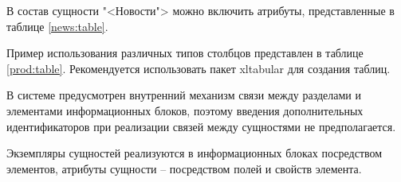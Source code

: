В состав сущности "<Новости"> можно включить атрибуты, представленные в таблице \ref{news:table}.



Пример использования различных типов столбцов представлен в таблице \ref{prod:table}. Рекомендуется использовать пакет xltabular для создания таблиц.

В системе предусмотрен внутренний механизм связи между разделами и элементами информационных блоков, поэтому введения дополнительных идентификаторов при реализации связей между сущностями не предполагается.

Экземпляры сущностей реализуются в информационных блоках посредством элементов, атрибуты сущности – посредством полей и свойств элемента. 

